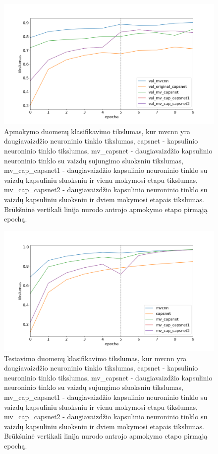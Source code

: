 \begin{figure}[H]
	\centering
	\includegraphics[scale=0.5]{img/validated.png}
	\caption{
		Apmokymo duomenų klasifikavimo tikslumas, kur mvcnn yra daugiavaizdžio neuroninio tinklo tikslumas, capsnet - kapsulinio neuroninio tinklo tikslumas, mv\_capsnet - daugiavaizdžio kapsulinio neuroninio tinklo su vaizdų sujungimo sluoksniu tikslumas, mv\_cap\_capsnet1 - daugiavaizdžio kapsulinio neuroninio tinklo su vaizdų kapsuliniu sluoksniu ir vienu mokymosi etapu tikslumas, mv\_cap\_capsnet2 - daugiavaizdžio kapsulinio neuroninio tinklo su vaizdų kapsuliniu sluoksniu ir dviem mokymosi etapais tikslumas. Brūkšninė vertikali linija nurodo antrojo apmokymo etapo pirmąją epochą.
	}
	\label{img:train_plot}
\end{figure}

\begin{figure}[H]
	\centering
	\includegraphics[scale=0.5]{img/trained.png}
	\caption{
		Testavimo duomenų klasifikavimo tikslumas, kur mvcnn yra daugiavaizdžio neuroninio tinklo tikslumas, capsnet - kapsulinio neuroninio tinklo tikslumas, mv\_capsnet - daugiavaizdžio kapsulinio neuroninio tinklo su vaizdų sujungimo sluoksniu tikslumas, mv\_cap\_capsnet1 - daugiavaizdžio kapsulinio neuroninio tinklo su vaizdų kapsuliniu sluoksniu ir vienu mokymosi etapu tikslumas, mv\_cap\_capsnet2 - daugiavaizdžio kapsulinio neuroninio tinklo su vaizdų kapsuliniu sluoksniu ir dviem mokymosi etapais tikslumas. Brūkšninė vertikali linija nurodo antrojo apmokymo etapo pirmąją epochą.
	}
	\label{img:val_plot}
\end{figure}
